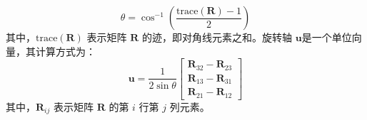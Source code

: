 \begin{equation}
\theta = \cos^{-1} \left( \frac{\text{trace}(\symbf{R}) - 1}{2} \right)
\end{equation}
其中，\( \text{trace}(\symbf{R}) \) 表示矩阵 \( \symbf{R} \) 的迹，即对角线元素之和。旋转轴 \( \symbf{u} \)是一个单位向量，其计算方式为：
\begin{equation}
\symbf{u} = \frac{1}{2 \sin \theta} \begin{bmatrix}
\symbf{R}_{32} - \symbf{R}_{23} \\
\symbf{R}_{13} - \symbf{R}_{31} \\
\symbf{R}_{21} - \symbf{R}_{12}
\end{bmatrix}
\end{equation}
其中，\( \symbf{R}_{ij} \) 表示矩阵 \( \symbf{R} \) 的第 \( i \) 行第 \( j \) 列元素。


